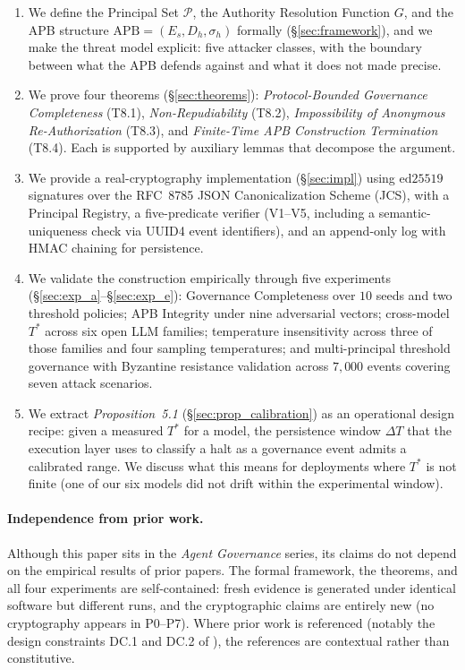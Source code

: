 \documentclass[11pt]{article}
\newcommand{\Pset}{\mathcal{P}}
\newcommand{\Es}{E_s}
\newcommand{\Dh}{D_h}
\newcommand{\sigh}{\sigma_h}
\newcommand{\Tstar}{T^*}
\newcommand{\APB}{\mathrm{APB}}
\begin{document}
\begin{enumerate}[leftmargin=2em, topsep=2pt, itemsep=2pt]
  \item We define the Principal Set $\Pset$, the Authority Resolution
        Function $G$, and the APB structure
        $\APB = (\Es, \Dh, \sigh)$ formally
        (\S\ref{sec:framework}), and we make the threat model explicit:
        five attacker classes, with the boundary between what the APB
        defends against and what it does not made precise.
  \item We prove four theorems (\S\ref{sec:theorems}):
        \emph{Protocol-Bounded Governance Completeness} (T8.1),
        \emph{Non-Repudiability} (T8.2),
        \emph{Impossibility of Anonymous Re-Authorization} (T8.3),
        and \emph{Finite-Time APB Construction Termination} (T8.4).
        Each is supported by auxiliary lemmas that decompose the
        argument.
  \item We provide a real-cryptography implementation
        (\S\ref{sec:impl}) using $\text{ed25519}$ signatures over the
        RFC~8785 JSON Canonicalization Scheme (JCS), with a Principal
        Registry, a five-predicate verifier (V1--V5, including a
        semantic-uniqueness check via UUID4 event identifiers), and an
        append-only log with HMAC chaining for persistence.
  \item We validate the construction empirically through five
        experiments (\S\ref{sec:exp_a}--\S\ref{sec:exp_e}):
        Governance Completeness over $10$ seeds and two threshold
        policies; APB Integrity under nine adversarial vectors;
        cross-model $\Tstar$ across six open LLM families;
        temperature insensitivity across three of those families
        and four sampling temperatures; and multi-principal
        threshold governance with Byzantine resistance validation
        across $7{,}000$ events covering seven attack scenarios.
  \item We extract \emph{Proposition~5.1} (\S\ref{sec:prop_calibration})
        as an operational design recipe: given a measured $\Tstar$
        for a model, the persistence window $\Delta T$ that the
        execution layer uses to classify a halt as a governance event
        admits a calibrated range. We discuss what this means for
        deployments where $\Tstar$ is not finite (one of our six
        models did not drift within the experimental window).
\end{enumerate}

\paragraph{Independence from prior work.}
Although this paper sits in the \emph{Agent Governance} series, its claims
do not depend on the empirical results of prior papers. The formal
framework, the theorems, and all four experiments are self-contained:
fresh evidence is generated under identical software but different runs,
and the cryptographic claims are entirely new (no cryptography appears
in P0--P7). Where prior work is referenced (notably the design constraints
DC.1 and DC.2 of \citep{fernandez2026applied}), the references are
contextual rather than constitutive.
\end{document}
